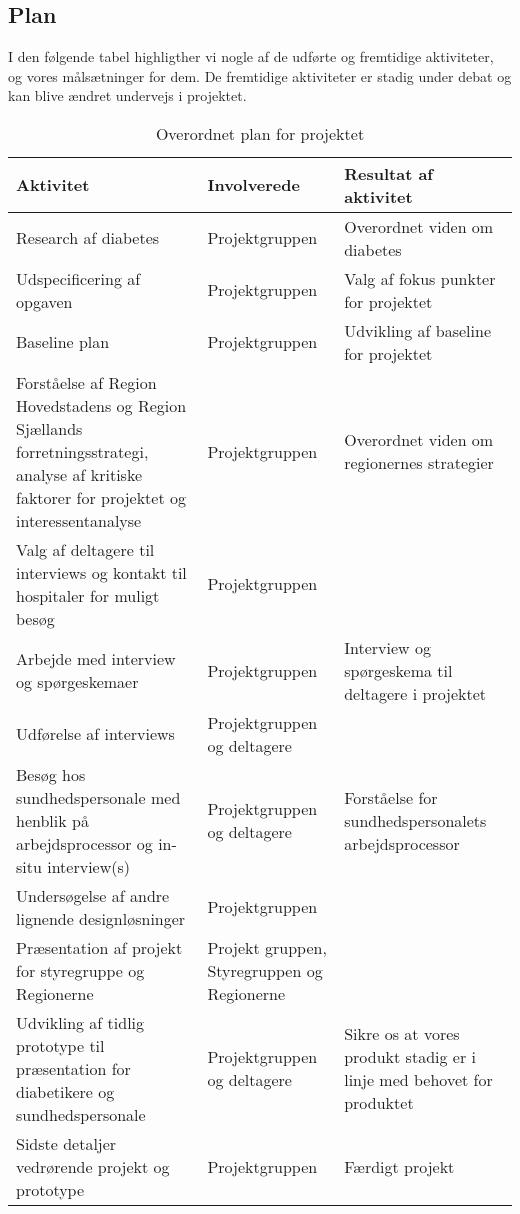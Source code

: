 \newpage
\subsection{Plan}
I den følgende tabel highligther vi nogle af de udførte og fremtidige aktiviteter, og vores målsætninger for dem. De fremtidige aktiviteter er stadig under debat og kan blive ændret undervejs i projektet.
\begin{table}[h!]
	\centering
	\begin{tabularx}{\textwidth}{|X|M|X|}
		\hline
		Aktivitet&Involverede&Resultat af aktivitet\\
		\hline
		Research af diabetes & Projektgruppen & Overordnet viden om diabetes\\
		\hline
		Udspecificering af opgaven & Projektgruppen & Valg af fokus punkter for projektet\\
		\hline
		Baseline plan & Projektgruppen & Udvikling af baseline for projektet\\
		\hline
		Forståelse af Region Hovedstadens og Region Sjællands forretningsstrategi, analyse af kritiske faktorer for projektet og interessentanalyse & Projektgruppen & Overordnet viden om regionernes strategier\\
		\hline
		Valg af deltagere til interviews og kontakt til hospitaler for muligt besøg & Projektgruppen & \\
		\hline
		Arbejde med interview og spørgeskemaer & Projektgruppen & Interview og spørgeskema til deltagere i projektet\\
		\hline
		Udførelse af interviews & Projektgruppen og deltagere & \\
		\hline
		Besøg hos sundhedspersonale med henblik på arbejdsprocessor og in-situ interview(s) & Projektgruppen og deltagere & Forståelse for sundhedspersonalets arbejdsprocessor\\
		\hline
		Undersøgelse af andre lignende designløsninger & Projektgruppen & \\
		\hline
		Præsentation af projekt for styregruppe og Regionerne & Projekt gruppen, Styregruppen og Regionerne & \\
		\hline
		Udvikling af tidlig prototype til præsentation for diabetikere og sundhedspersonale & Projektgruppen og deltagere & Sikre os at vores produkt stadig er i linje med behovet for produktet\\
		\hline
		Sidste detaljer vedrørende projekt og prototype & Projektgruppen & Færdigt projekt\\
		\hline
	\end{tabularx}
	\caption{Overordnet plan for projektet}
\end{table}
